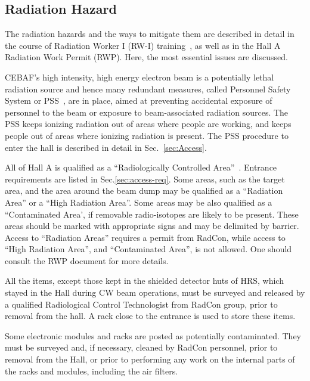 \begin{safetyen}{0}{0}
\section{Radiation Hazard} 
\label{sec:radhazard}
\end{safetyen}
  The radiation hazards and the ways to mitigate them are described in detail in the
  course of Radiation Worker I (RW-I) training~\cite{RWIcebaf},
  as well as in the Hall A Radiation Work Permit (RWP).
  Here, the most essential issues are discussed.

  CEBAF's high intensity, high energy electron beam 
  is a potentially lethal radiation source and hence many redundant measures,
  called Personnel Safety System or PSS~\cite{PSScebaf}, are in place,
   aimed at preventing accidental exposure of personnel to the beam or exposure 
  to beam-associated radiation sources.
  The PSS keeps ionizing radiation out of areas where people are working,
  and keeps people out of areas where ionizing radiation is present. 
  The PSS procedure to enter the hall is described in detail in  Sec.~\ref{sec:Access}.


 All of Hall A is qualified as a ``Radiologically Controlled Area''~\cite{RWIcebaf}.
 Entrance requirements are listed in Sec.\ref{sec:access-req}.
 Some areas, such as the target area, and the area around the beam dump may be qualified as 
 a ``Radiation Area'' or a ``High Radiation Area''. Some areas may be also qualified 
 as a ``Contaminated Area', if removable radio-isotopes are likely to be present.
 These areas should be marked with appropriate signs and may be delimited by barrier. 
 Access to ``Radiation Areas'' requires a permit from RadCon, while access
 to ``High Radiation Area'', and ``Contaminated Area'', is not allowed. One should consult 
 the RWP document for more details.

 All the items, except those kept in the shielded detector huts of HRS,
          which stayed in the Hall during CW beam operations,
          must be surveyed and released by a qualified Radiological Control Technologist from
          RadCon group, prior to removal from the hall.
          A rack close to the entrance is used to store these items.

 Some electronic modules and racks are posted as potentially contaminated.
 They must be surveyed and, if necessary, cleaned by RadCon personnel,
 prior to removal from the Hall, or prior to performing any work on the internal parts of the racks
 and modules, including the air filters. 
 
